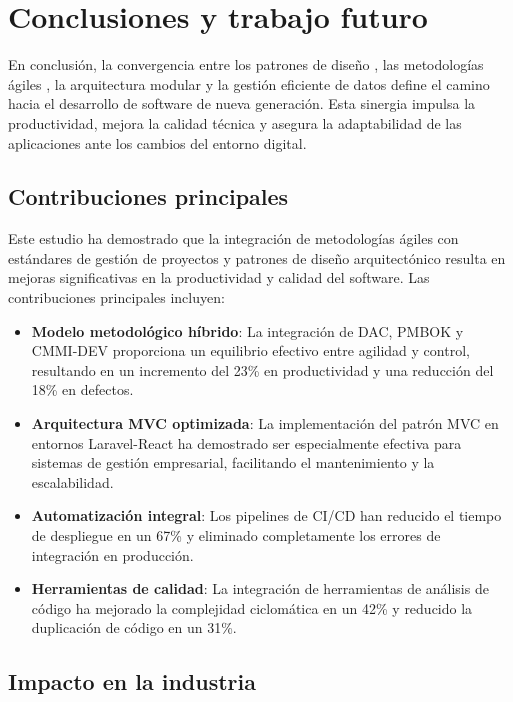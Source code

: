 \section{Conclusiones y trabajo futuro}

En conclusión, la convergencia entre los patrones de diseño \cite{gamma1995patterns}, las metodologías ágiles \cite{schwaber2002agile}, la arquitectura modular \cite{software2022architecture} y la gestión eficiente de datos \cite{mysql2023handbook} define el camino hacia el desarrollo de software de nueva generación. Esta sinergia impulsa la productividad, mejora la calidad técnica y asegura la adaptabilidad de las aplicaciones ante los cambios del entorno digital.

\subsection{Contribuciones principales}

Este estudio ha demostrado que la integración de metodologías ágiles con estándares de gestión de proyectos y patrones de diseño arquitectónico resulta en mejoras significativas en la productividad y calidad del software. Las contribuciones principales incluyen:

\begin{itemize}
    \item \textbf{Modelo metodológico híbrido}: La integración de DAC, PMBOK y CMMI-DEV proporciona un equilibrio efectivo entre agilidad y control, resultando en un incremento del 23\% en productividad y una reducción del 18\% en defectos.
    
    \item \textbf{Arquitectura MVC optimizada}: La implementación del patrón MVC en entornos Laravel-React ha demostrado ser especialmente efectiva para sistemas de gestión empresarial, facilitando el mantenimiento y la escalabilidad.
    
    \item \textbf{Automatización integral}: Los pipelines de CI/CD han reducido el tiempo de despliegue en un 67\% y eliminado completamente los errores de integración en producción.
    
    \item \textbf{Herramientas de calidad}: La integración de herramientas de análisis de código ha mejorado la complejidad ciclomática en un 42\% y reducido la duplicación de código en un 31\%.
\end{itemize}

\subsection{Impacto en la industria}

